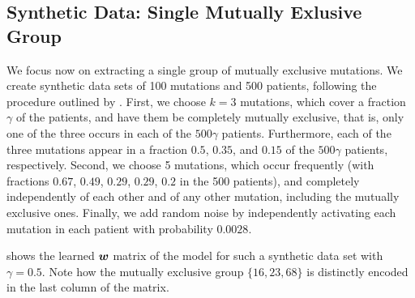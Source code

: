 \subsection{Synthetic Data: Single Mutually Exlusive Group} \label{sect:syn_single}
We focus now on extracting a single group of mutually exclusive mutations.
We create synthetic data sets of 100 mutations and 500 patients, following the procedure outlined by \cite{comet}.
First, we choose $k = 3$ mutations, which cover a fraction $\gamma$ of the patients, and have them be completely mutually exclusive, that is, only one of the three occurs in each of the $500\gamma$ patients.
Furthermore, each of the three mutations appear in a fraction $0.5$, $0.35$, and $0.15$ of the $500\gamma$ patients, respectively.
Second, we choose 5 mutations, which occur frequently (with fractions $0.67$, $0.49$, $0.29$, $0.29$, $0.2$ in the 500 patients), and completely independently of each other and of any other mutation, including the mutually exclusive ones.
Finally, we add random noise by independently activating each mutation in each patient with probability $0.0028$.

 shows the learned $\bm{w}$ matrix of the \fldc{} model for such a synthetic data set with $\gamma = 0.5$.
Note how the mutually exclusive group $\{16, 23, 68\}$ is distinctly encoded in the last column of the matrix.


